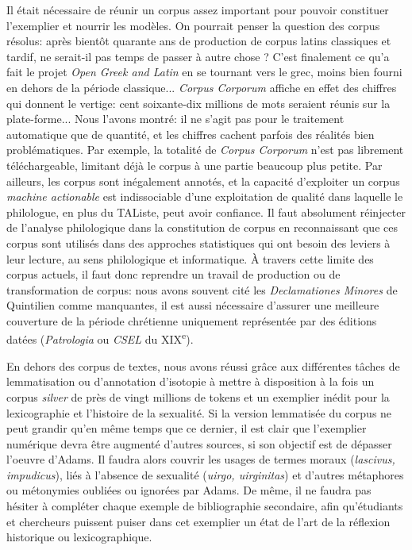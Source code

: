 Il était nécessaire de réunir un corpus assez important pour pouvoir constituer l'exemplier et nourrir les modèles. On pourrait penser la question des corpus résolus: après bientôt quarante ans de production de corpus latins classiques et tardif, ne serait-il pas temps de passer à autre chose ? C'est finalement ce qu'a fait le projet \textit{Open Greek and Latin} en se tournant vers le grec, moins bien fourni en dehors de la période classique... \textit{Corpus Corporum} affiche en effet des chiffres qui donnent le vertige: cent soixante-dix millions de mots seraient réunis sur la plate-forme... Nous l'avons montré: il ne s'agit pas pour le traitement automatique que de quantité, et les chiffres cachent parfois des réalités bien problématiques. Par exemple, la totalité de \textit{Corpus Corporum} n'est pas librement téléchargeable, limitant déjà le corpus à une partie beaucoup plus petite. Par ailleurs, les corpus sont inégalement annotés, et la capacité d'exploiter un corpus \textit{machine actionable} est indissociable d'une exploitation de qualité dans laquelle le philologue, en plus du TAListe, peut avoir confiance. Il faut absolument réinjecter de l'analyse philologique dans la constitution de corpus en reconnaissant que ces corpus sont utilisés dans des approches statistiques qui ont besoin des leviers à leur lecture, au sens philologique et informatique. À travers cette limite des corpus actuels, il faut donc reprendre un travail de production ou de transformation de corpus: nous avons souvent cité les \textit{Declamationes Minores} de Quintilien comme manquantes, il est aussi nécessaire d'assurer une meilleure couverture de la période chrétienne uniquement représentée par des éditions datées (\textit{Patrologia} ou \textit{CSEL} du XIX\textsuperscript{e}). 

En dehors des corpus de textes, nous avons réussi grâce aux différentes tâches de lemmatisation ou d'annotation d'isotopie à mettre à disposition à la fois un corpus \textit{silver} de près de vingt millions de tokens et un exemplier inédit pour la lexicographie et l'histoire de la sexualité. Si la version lemmatisée du corpus ne peut grandir qu'en même temps que ce dernier, il est clair que l'exemplier numérique devra être augmenté d'autres sources, si son objectif est de dépasser l'oeuvre d'Adams. Il faudra alors couvrir les usages de termes moraux (\textit{lascivus, impudicus}), liés à l'absence de sexualité (\textit{uirgo, uirginitas}) et d'autres métaphores ou métonymies oubliées ou ignorées par Adams. De même, il ne faudra pas hésiter à compléter chaque exemple de bibliographie secondaire, afin qu'étudiants et chercheurs puissent puiser dans cet exemplier un état de l'art de la réflexion historique ou lexicographique.

